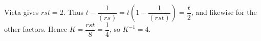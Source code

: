 Vieta gives $rst=2$. Thus $t-\dfrac{1}{(rs)}=t(1-\dfrac{1}{(rst)})=\dfrac{t}{2}$, and likewise for the other factors. Hence $K=\dfrac{rst}{8}=\dfrac{1}{4}$, so $\boxed{K^{-1}=4}$.
